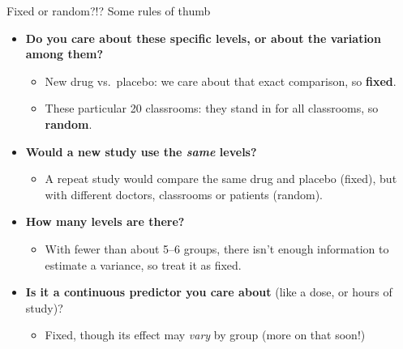 \documentclass[
  ignorenonframetext,
  aspectratio=169,
]{beamer}
\providecommand{\tightlist}{%
  \setlength{\itemsep}{0pt}\setlength{\parskip}{0pt}}\usepackage{longtable,booktabs,array}
\begin{document}
\begin{frame}{Fixed or random?!? Some rules of thumb}
\label{fixed-or-random-some-rules-of-thumb}
\begin{itemize}
\tightlist
\item
  \textbf{Do you care about these specific levels, or about the
  variation among them?}

  \begin{itemize}
  \tightlist
  \item
    New drug vs.~placebo: we care about that exact comparison, so
    \textbf{fixed}.
  \item
    These particular 20 classrooms: they stand in for all classrooms, so
    \textbf{random}.
  \end{itemize}
\end{itemize}

\pause

\begin{itemize}
\tightlist
\item
  \textbf{Would a new study use the \emph{same} levels?}

  \begin{itemize}
  \tightlist
  \item
    A repeat study would compare the same drug and placebo (fixed), but
    with different doctors, classrooms or patients (random).
  \end{itemize}
\end{itemize}

\pause

\begin{itemize}
\tightlist
\item
  \textbf{How many levels are there?}

  \begin{itemize}
  \tightlist
  \item
    With fewer than about 5--6 groups, there isn't enough information to
    estimate a variance, so treat it as fixed.
  \end{itemize}
\end{itemize}

\pause

\begin{itemize}
\tightlist
\item
  \textbf{Is it a continuous predictor you care about} (like a dose, or
  hours of study)?

  \begin{itemize}
  \tightlist
  \item
    Fixed, though its effect may \emph{vary} by group (more on that
    soon!)
  \end{itemize}
\end{itemize}
\end{frame}
\end{document}
